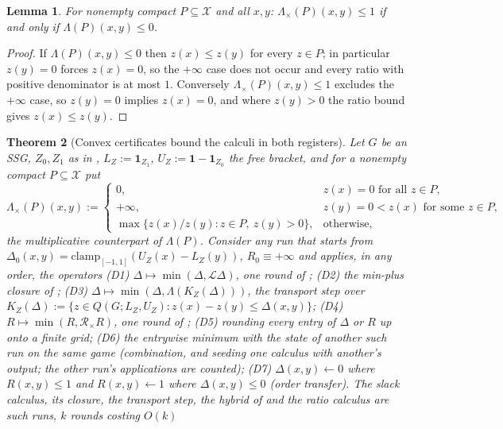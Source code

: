 \documentclass[11pt]{article}
\theoremstyle{plain}
\newtheorem{theorem}{Theorem}[section]
\newtheorem{lemma}[theorem]{Lemma}
\theoremstyle{definition}
\newcommand{\bbone}{\mathbf{1}}
\begin{document}
\begin{lemma}\label{lem:ratio-sign}
For nonempty compact $P\subseteq\mathcal X$ and all $x,y$:
$\Lambda_{\times}(P)(x,y)\le1$ if and only if $\Lambda(P)(x,y)\le0$.
\end{lemma}

\begin{proof}
If $\Lambda(P)(x,y)\le0$ then $z(x)\le z(y)$ for every $z\in P$; in
particular $z(y)=0$ forces $z(x)=0$, so the $+\infty$ case does not occur
and every ratio with positive denominator is at most $1$. Conversely
$\Lambda_\times(P)(x,y)\le1$ excludes the $+\infty$ case, so $z(y)=0$
implies $z(x)=0$, and where $z(y)>0$ the ratio bound gives
$z(x)\le z(y)$.
\end{proof}

\begin{theorem}[Convex certificates bound the calculi in both registers]\label{thm:convex-barrier-both}
Let $G$ be an SSG, $Z_0,Z_1$ as in , $L_Z:=\bbone_{Z_1}$,
$U_Z:=\bbone-\bbone_{Z_0}$ the \emph{free bracket}, and for a nonempty
compact $P\subseteq\mathcal X$ put
\[
  \Lambda_{\times}(P)(x,y):=
  \begin{cases}
    0,&z(x)=0\text{ for all }z\in P,\\
    +\infty,&z(y)=0<z(x)\text{ for some }z\in P,\\
    \max\{z(x)/z(y):z\in P,\ z(y)>0\},&\text{otherwise,}
  \end{cases}
\]
the multiplicative counterpart of $\Lambda(P)$. Consider any run that
starts from $\Delta_0(x,y)=\mathrm{clamp}_{[-1,1]}(U_Z(x)-L_Z(y))$,
$R_0\equiv+\infty$ and applies, in any order, the operators
\textup{(D1)} $\Delta\mapsto\min(\Delta,\mathcal L\Delta)$, one round of
; \textup{(D2)} the min-plus closure of
; \textup{(D3)} $\Delta\mapsto\min(\Delta,\Lambda(K_Z(\Delta)))$,
the transport step over $K_Z(\Delta):=\{z\in Q(G;L_Z,U_Z):z(x)-z(y)\le\Delta(x,y)\}$;
\textup{(D4)} $R\mapsto\min(R,\mathcal R_\times R)$, one round of
; \textup{(D5)} rounding every entry of $\Delta$ or $R$ up
onto a finite grid; \textup{(D6)} the entrywise minimum with the state of
another such run on the same game (combination, and seeding one calculus
with another's output; the other run's applications are counted);
\textup{(D7)} $\Delta(x,y)\leftarrow0$ where $R(x,y)\le1$ and
$R(x,y)\leftarrow1$ where $\Delta(x,y)\le0$ (order transfer). The slack
calculus, its closure, the transport step, the hybrid of 
and the ratio calculus are such runs, $k$ rounds costing $O(k)$

\end{theorem}
\end{document}
